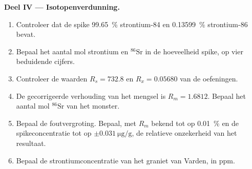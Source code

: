 \begin{problem}
\noindent\textbf{Deel IV --- Isotopenverdunning.}
\begin{enumerate}[resume]
  \item Controleer dat de spike \qty{99.65}{\percent} strontium-84 en \qty{0.13599}{\percent}
        strontium-86 bevat.
  \item Bepaal het aantal mol strontium en $^{86}\mathrm{Sr}$ in de hoeveelheid spike, op vier
        beduidende cijfers.
  \item Controleer de waarden $R_s = 732.8$ en $R_x = 0.05680$ van de oefeningen.
  \item De gecorrigeerde verhouding van het mengsel is $R_m = 1.6812$. Bepaal het aantal mol $^{86}\mathrm{Sr}$
        van het monster.
  \item Bepaal de foutvergroting. Bepaal, met $R_m$ bekend tot op \qty{0.01}{\percent} en de
        spikeconcentratie tot op $\pm\qty{0.031}{\micro\gram\per\gram}$, de relatieve onzekerheid van
        het resultaat.
  \item Bepaal de strontiumconcentratie van het graniet van Varden, in ppm.
\end{enumerate}
\end{problem}
